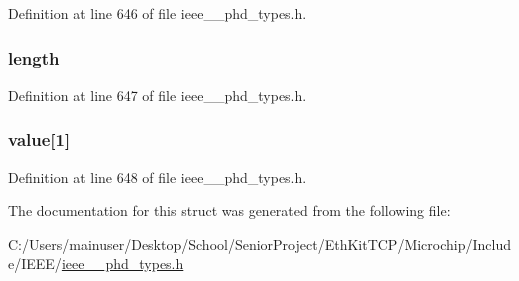 Definition at line 646 of file ieee\+\_\+\_\+phd\+\_\+types.\+h.

\hypertarget{struct___type_ver_list_a3743679e4ff85e3e1b3fc2e59973fbb3}{}
\subsubsection[{length}]{ length}\label{struct___type_ver_list_a3743679e4ff85e3e1b3fc2e59973fbb3}


Definition at line 647 of file ieee\+\_\+\_\+phd\+\_\+types.\+h.

\hypertarget{struct___type_ver_list_af11bd03543be13f22962ee28dd33ea95}{}
\subsubsection[{value}]{ value\mbox{[}1\mbox{]}}\label{struct___type_ver_list_af11bd03543be13f22962ee28dd33ea95}


Definition at line 648 of file ieee\+\_\+\_\+phd\+\_\+types.\+h.



The documentation for this struct was generated from the following file\+:\begin{DoxyCompactItemize}
\item 
C\+:/\+Users/mainuser/\+Desktop/\+School/\+Senior\+Project/\+Eth\+Kit\+T\+C\+P/\+Microchip/\+Include/\+I\+E\+E\+E/\hyperlink{ieee__11073__phd__types_8h}{ieee\+\_\+\_\+phd\+\_\+types.\+h}\end{DoxyCompactItemize}
